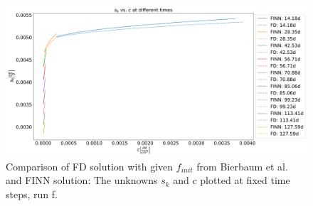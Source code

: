 \begin{figure}[h!]
	\centering
	\includegraphics[scale=0.29]{images/res_sorp_exp_pf.png}
\caption[FINN predicted sorption behavior, run f]{Comparison of FD solution with given $f_{init}$ from Bierbaum et al. and FINN solution: The unknowns $s_k$ and $c$ plotted at fixed time steps, run f.}
\label{fig:res_sorp_exp_pf}
\end{figure}
\FloatBarrier
